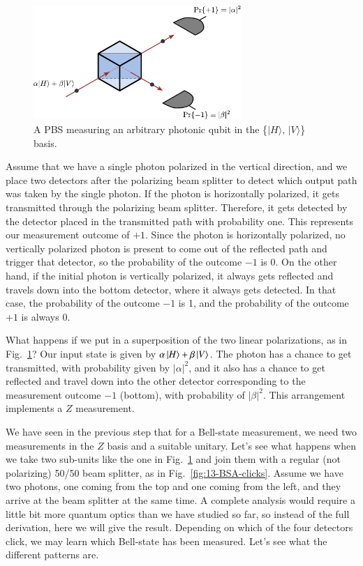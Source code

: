 \begin{figure}[t]
    \centering
    \includegraphics[width=0.7\textwidth]{lesson13/13-3_PBS_measure.pdf}
    \caption[A polarizing beam splitter (PBS) measuring a qubit]{A PBS measuring an arbitrary photonic qubit in the \{$|H\rangle$, $|V\rangle$\} basis.}
    \label{fig:13-PBS-measure}
\end{figure}

Assume that we have a single photon polarized in the vertical direction, and we place two detectors after the polarizing beam splitter to detect which output path was taken by the single photon. If the photon is horizontally polarized, it gets transmitted through the polarizing beam splitter.
Therefore, it gets detected by the detector placed in the transmitted path with probability one.
This represents our measurement outcome of $+1$. Since the photon is horizontally polarized, no vertically polarized photon is present to come out of the reflected path and trigger that detector, so the probability of the outcome $-1$ is 0.
On the other hand, if the initial photon is vertically polarized, it always gets reflected and travels down into the bottom detector, where it always gets detected.
In that case, the probability of the outcome $-1$ is 1, and the probability of the outcome $+1$ is always 0.

What happens if we put in a superposition of the two linear polarizations, as in Fig.~\ref{fig:13-PBS-measure}?
Our input state is given by $\alpha\left| H \right\rangle + \beta \left| V \right\rangle$.
The photon has a chance to get transmitted, with probability given by $|\alpha|^2$, and it also has a chance to get reflected and travel down into the other detector corresponding to the measurement outcome $-1$ (bottom), with probability of $|\beta|^2$.
This arrangement implements a $Z$ measurement.

We have seen in the previous step that for a Bell-state measurement, we need two measurements in the $Z$ basis and a suitable unitary.
Let's see what happens when we take two sub-units like the one in Fig.~\ref{fig:13-PBS-measure} and join them with a regular (not polarizing) 50/50 beam splitter, as in Fig.~\ref{fig:13-BSA-clicks}. Assume we have two photons, one coming from the top and one coming from the left, and they arrive at the beam splitter at the same time.
A complete analysis would require a little bit more quantum optics than we have studied so far, so instead of the full derivation, here we will give the result. Depending on which of the four detectors click, we may learn which Bell-state has been measured. Let's see what the different patterns are.

